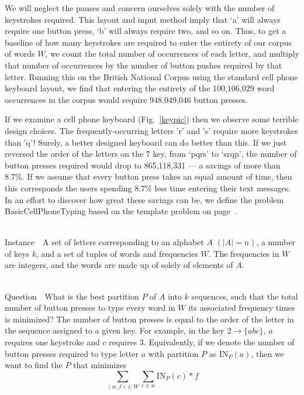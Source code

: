 \documentclass[runningheads]{llncs}
\newcommand{\Instance}{{\sc Instance~}}
\newcommand{\Question}{~\\
{\sc Question~}}
\begin{document}
We will neglect the pauses and concern ourselves solely with the number of
keystrokes required.  This layout and input method imply that `a' will always
require one button press, `b' will always require two, and so on.  Thus, to get
a baseline of how many keystrokes are required to enter the entirety of our
corpus of words $W$, we count the total number of occurrences of each letter,
and multiply that number of occurrences by the number of button pushes required
by that letter.  Running this on the British National Corpus using the standard
cell phone keyboard layout, we find that entering the entirety of the
100,106,029 word occurrences in the corpus would require 948,049,046 button
presses.  

If we examine a cell phone keyboard (Fig.~\ref{keypic}) then we observe some terrible design choices.  The frequently-occurring letters
'r' and 's' require more keystrokes than 'q'!  Surely, a better designed
keyboard can do better than this.  If we just reversed the order of the letters
on the 7 key, from `pqrs' to `srqp', the number of button presses required
would drop to 865,118,331 --- a savings of more than $8.7\%$.  If we assume
that every button press takes an equal amount of time, then this corresponds
the users spending $8.7\%$ less time entering their text messages.  In an
effort to discover how great these savings can be, we define the problem {\sc
BasicCellPhoneTyping} based on the template problem on
page~\pageref{probtemplate}.

\begin{prob}[{\sc BasicCellPhoneTyping}]~\\
\Instance\ A set of letters corresponding to an alphabet $A$ $(|A| =
n)$, a number of keys $k$, and a set of
tuples of words and frequencies $W$.  The frequencies in $W$ are integers,
and the words are made up of solely of elements of $A$. 

\Question\ What is the best partition $P$ of $A$ into $k$ sequences, such
that the total number of button presses to type every word in $W$ its
associated frequency times is minimized?  The number of button presses is equal
to the order of the letter in the sequence assigned to a given key.  For
example, in the key $2\to\{abc\}$, $a$ requires one keystroke and $c$ requires
3.  Equivalently, if we denote the number of button presses required to type
letter $a$ with partition $P$ as $\mathrm{IN}_P(a)$, then we want to find the $P$ that
minimizes $$\sum_{(w,f) \in W}\sum_{c\in w} \mathrm{IN}_P(c) * f$$
\label{bcpt}
\end{prob}
\end{document}
